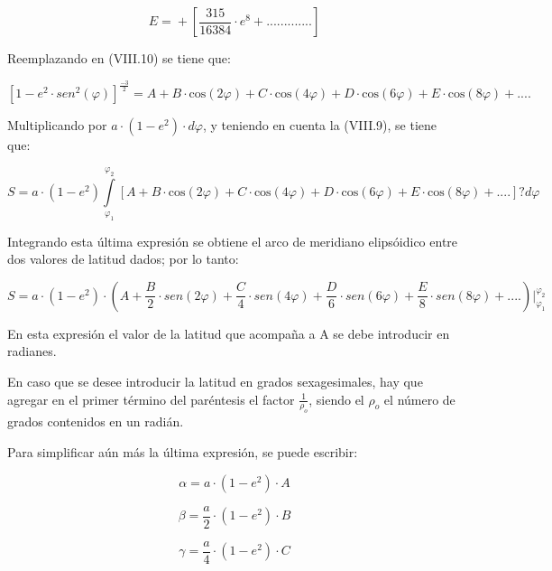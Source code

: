 \documentclass[]{article}
\begin{document}
\[{E=\overset{}{{}}\overset{}{{}}\overset{}{{}}\overset{}{{}}\overset{}{{}}\overset{}{{}}\overset{}{{}}\overset{}{{}}\overset{}{{}}\overset{}{{}}\overset{}{{}}\overset{}{{}}\overset{}{{}}\overset{}{{}}\overset{}{{}}+\left[\frac{\text{315}}{\text{16384}}\cdot
e^{{8}}+\text{.}\text{.}\text{.}\text{.}\text{.}\text{.}\text{.}\text{.}\text{.}\text{.}\text{.}\text{.}\text{.}\right]}\]

Reemplazando en (VIII.10) se tiene que:

\[{\left[1-e^{{2}}\cdot sen^{{2}}\left(\varphi
\right)\right]^{{\frac{-3}{2}}}=A+B\cdot \text{cos}\left(2\varphi
\right)+C\cdot \text{cos}\left(4\varphi \right)+D\cdot
\text{cos}\left(6\varphi \right)+E\cdot \text{cos}\left(8\varphi
\right)+\text{.}\text{.}\text{.}\text{.}}\]

Multiplicando por \({a\cdot \left(1-e^{{2}}\right)\cdot d\varphi}\), y
teniendo en cuenta la (VIII.9), se tiene que:

\[{S=a\cdot \left(1-e^{{2}}\right)\overset{\varphi
_{{2}}}{\underset{{\varphi _{{1}}}}{\int }}{\left[A+B\cdot
\text{cos}\left(2\varphi \right)+C\cdot \text{cos}\left(4\varphi
\right)+D\cdot \text{cos}\left(6\varphi \right)+E\cdot
\text{cos}\left(8\varphi
\right)+\text{.}\text{.}\text{.}\text{.}\right]}{?d\varphi }}\]

Integrando esta última expresión se obtiene el arco de meridiano
elipsóidico entre dos valores de latitud dados; por lo tanto:

\[{S=a\cdot \left(1-e^{{2}}\right)\cdot \left(A+\frac{B}{2}\cdot
sen\left(2\varphi \right)+\frac{C}{4}\cdot
sen\left(4\varphi \right)+\frac{D}{6}\cdot
sen\left(6\varphi \right)+\frac{E}{8}\cdot
sen\left(8\varphi
\right)+\text{.}\text{.}\text{.}\text{.}\right)|_{{\varphi
_{{1}}}}^{\varphi _{{2}}}}\]

En esta expresión el valor de la latitud que acompaña a A se debe
introducir en radianes.

En caso que se desee introducir la latitud en grados sexagesimales, hay
que agregar en el primer término del paréntesis el factor
\({\frac{1}{\rho _{{o}}}}\), siendo el \({\rho _{{o}}}\) el número de
grados contenidos en un radián.

Para simplificar aún más la última expresión, se puede escribir:

\[{\alpha =a\cdot \left(1-e^{{2}}\right)\cdot A}\]

\[{\beta =\frac{a}{2}\cdot \left(1-e^{{2}}\right)\cdot B}\]

\[{\gamma =\frac{a}{4}\cdot \left(1-e^{{2}}\right)\cdot C}\]
\end{document}
